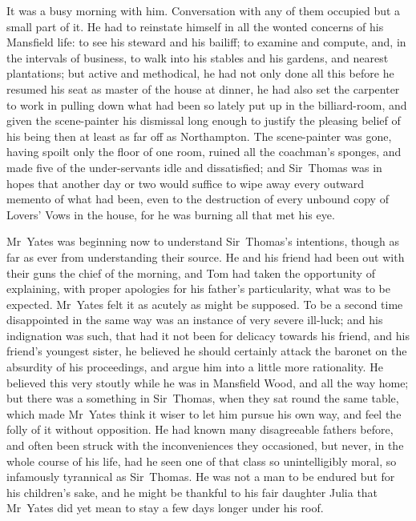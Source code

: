 It was a busy morning with him. Conversation with any of them occupied but a small part of it. He had to reinstate himself in all the wonted concerns of his Mansfield life: to see his steward and his bailiff; to examine and compute, and, in the intervals of business, to walk into his stables and his gardens, and nearest plantations; but active and methodical, he had not only done all this before he resumed his seat as master of the house at dinner, he had also set the carpenter to work in pulling down what had been so lately put up in the billiard-room, and given the scene-painter his dismissal long enough to justify the pleasing belief of his being then at least as far off as Northampton. The scene-painter was gone, having spoilt only the floor of one room, ruined all the coachman's sponges, and made five of the under-servants idle and dissatisfied; and Sir~Thomas was in hopes that another day or two would suffice to wipe away every outward memento of what had been, even to the destruction of every unbound copy of Lovers' Vows in the house, for he was burning all that met his eye.

Mr~Yates was beginning now to understand Sir~Thomas's intentions, though as far as ever from understanding their source. He and his friend had been out with their guns the chief of the morning, and Tom had taken the opportunity of explaining, with proper apologies for his father's particularity, what was to be expected. Mr~Yates felt it as acutely as might be supposed. To be a second time disappointed in the same way was an instance of very severe ill-luck; and his indignation was such, that had it not been for delicacy towards his friend, and his friend's youngest sister, he believed he should certainly attack the baronet on the absurdity of his proceedings, and argue him into a little more rationality. He believed this very stoutly while he was in Mansfield Wood, and all the way home; but there was a something in Sir~Thomas, when they sat round the same table, which made Mr~Yates think it wiser to let him pursue his own way, and feel the folly of it without opposition. He had known many disagreeable fathers before, and often been struck with the inconveniences they occasioned, but never, in the whole course of his life, had he seen one of that class so unintelligibly moral, so infamously tyrannical as Sir~Thomas. He was not a man to be endured but for his children's sake, and he might be thankful to his fair daughter Julia that Mr~Yates did yet mean to stay a few days longer under his roof.

